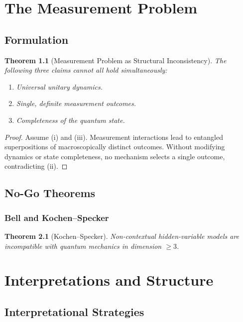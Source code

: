\documentclass[12pt]{book}
\theoremstyle{plain}
\newtheorem{theorem}{Theorem}[chapter]
\theoremstyle{definition}
\theoremstyle{remark}
\begin{document}
\part{The Measurement Problem}

\chapter{Formulation}

\begin{theorem}[Measurement Problem as Structural Inconsistency]
The following three claims cannot all hold simultaneously:
\begin{enumerate}[label=(\roman*)]
\item Universal unitary dynamics.
\item Single, definite measurement outcomes.
\item Completeness of the quantum state.
\end{enumerate}
\end{theorem}

\begin{proof}
Assume (i) and (iii). Measurement interactions lead to entangled superpositions of macroscopically distinct outcomes. Without modifying dynamics or state completeness, no mechanism selects a single outcome, contradicting (ii).
\end{proof}

\chapter{No-Go Theorems}

\section{Bell and Kochen--Specker}

\begin{theorem}[Kochen--Specker]
Non-contextual hidden-variable models are incompatible with quantum mechanics in dimension $\ge 3$.
\end{theorem}

\part{Interpretations and Structure}

\chapter{Interpretational Strategies}
\end{document}
